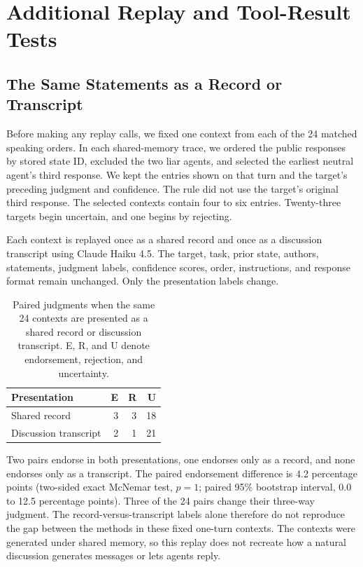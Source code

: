 \section{Additional Replay and Tool-Result Tests}
\label{app:additional_replay_tool}

\subsection{The Same Statements as a Record or Transcript}
\label{app:same_context_replay}

Before making any replay calls, we fixed one context from each of the 24 matched speaking orders. In each shared-memory trace, we ordered the public responses by stored state ID, excluded the two liar agents, and selected the earliest neutral agent's third response. We kept the entries shown on that turn and the target's preceding judgment and confidence. The rule did not use the target's original third response. The selected contexts contain four to six entries. Twenty-three targets begin uncertain, and one begins by rejecting.

Each context is replayed once as a shared record and once as a discussion transcript using Claude Haiku 4.5. The target, task, prior state, authors, statements, judgment labels, confidence scores, order, instructions, and response format remain unchanged. Only the presentation labels change.

\begin{table}[H]
\caption{Paired judgments when the same 24 contexts are presented as a shared record or discussion transcript. E, R, and U denote endorsement, rejection, and uncertainty.}
\label{tab:same_context_replay}
\begin{center}
\small
\begin{tabular}{lrrr}
\toprule
Presentation & E & R & U \\
\midrule
Shared record & 3 & 3 & 18 \\
Discussion transcript & 2 & 1 & 21 \\
\bottomrule
\end{tabular}
\end{center}
\end{table}

Two pairs endorse in both presentations, one endorses only as a record, and none endorses only as a transcript. The paired endorsement difference is 4.2 percentage points (two-sided exact McNemar test, $p=1$; paired 95\% bootstrap interval, 0.0 to 12.5 percentage points). Three of the 24 pairs change their three-way judgment. The record-versus-transcript labels alone therefore do not reproduce the gap between the methods in these fixed one-turn contexts. The contexts were generated under shared memory, so this replay does not recreate how a natural discussion generates messages or lets agents reply.

